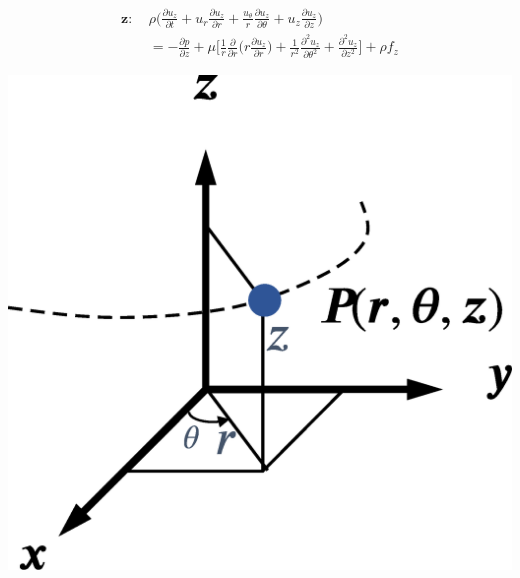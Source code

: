 \documentclass[a4paper]{article}
\begin{document}
\begin{minipage}{.75\textwidth}
\begin{itemize}
    \begin{equation*}
    \begin{split}
        \boldsymbol{z:} \ & \rho \bigg(\frac{\partial u_{z}}{\partial t} + u_{r} \frac{\partial u_{z}}{\partial r} + \frac{u_{\theta}}{r}\frac{\partial u_{z}}{\partial \theta} + u_{z}\frac{\partial u_{z}}{\partial z} \bigg) \\
        & = -\frac{\partial p}{\partial z} + \mu \bigg[ \frac{1}{r}\frac{\partial}{\partial r} \bigg(r \frac{\partial u_{z}}{\partial r}\bigg) + \frac{1}{r^{2}} \frac{\partial^{2} u_{z}}{\partial \theta^{2}} + \frac{\partial^{2} u_{z}}{\partial z^{2}} \bigg] + \rho f_{z}
    \end{split}
    \end{equation*}
\end{itemize}
\end{minipage}
\begin{minipage}{.25\textwidth}
    \includegraphics[width=.9\textwidth]{img/cylind_coord_sys.eps}
\end{minipage}

\vspace{.3cm}

    
\end{document}

